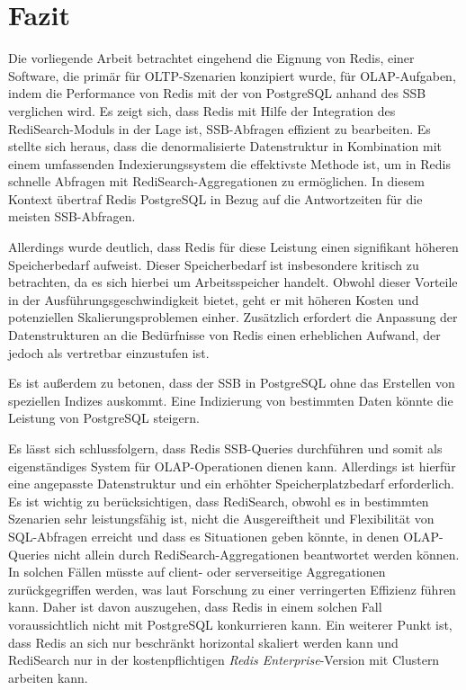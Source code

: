 \chapter{Fazit}
Die vorliegende Arbeit betrachtet eingehend die Eignung von Redis, einer Software, die primär für OLTP-Szenarien konzipiert wurde, für OLAP-Aufgaben, indem die Performance von Redis mit der von PostgreSQL anhand des \acf{SSB} verglichen wird. Es zeigt sich, dass Redis mit Hilfe der Integration des RediSearch-Moduls in der Lage ist, SSB-Abfragen effizient zu bearbeiten. Es stellte sich heraus, dass die denormalisierte Datenstruktur in Kombination mit einem umfassenden Indexierungssystem die effektivste Methode ist, um in Redis schnelle Abfragen mit RediSearch-Aggregationen zu ermöglichen. In diesem Kontext übertraf Redis PostgreSQL in Bezug auf die Antwortzeiten für die meisten SSB-Abfragen.

Allerdings wurde deutlich, dass Redis für diese Leistung einen signifikant höheren Speicherbedarf aufweist. Dieser Speicherbedarf ist insbesondere kritisch zu betrachten, da es sich hierbei um Arbeitsspeicher handelt. Obwohl dieser Vorteile in der Ausführungsgeschwindigkeit bietet, geht er mit höheren Kosten und potenziellen Skalierungsproblemen einher. Zusätzlich erfordert die Anpassung der Datenstrukturen an die Bedürfnisse von Redis einen erheblichen Aufwand, der jedoch als vertretbar einzustufen ist.

Es ist außerdem zu betonen, dass der \acf{SSB} in PostgreSQL ohne das Erstellen von speziellen Indizes auskommt. Eine Indizierung von bestimmten Daten könnte die Leistung von PostgreSQL steigern.

Es lässt sich schlussfolgern, dass Redis SSB-Queries durchführen und somit als eigenständiges System für OLAP-Operationen dienen kann. Allerdings ist hierfür eine angepasste Datenstruktur und ein erhöhter Speicherplatzbedarf erforderlich. Es ist wichtig zu berücksichtigen, dass RediSearch, obwohl es in bestimmten Szenarien sehr leistungsfähig ist, nicht die Ausgereiftheit und Flexibilität von SQL-Abfragen erreicht und dass es Situationen geben könnte, in denen OLAP-Queries nicht allein durch RediSearch-Aggregationen beantwortet werden können. In solchen Fällen müsste auf client- oder serverseitige Aggregationen zurückgegriffen werden, was laut Forschung zu einer verringerten Effizienz führen kann. Daher ist davon auszugehen, dass Redis in einem solchen Fall voraussichtlich nicht mit PostgreSQL konkurrieren kann. Ein weiterer Punkt ist, dass Redis an sich nur beschränkt horizontal skaliert werden kann und RediSearch nur in der kostenpflichtigen \emph{Redis Enterprise}-Version mit Clustern arbeiten kann.

